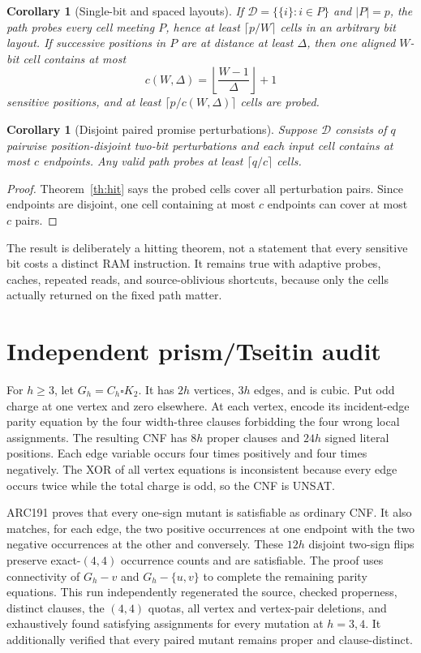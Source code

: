\documentclass[11pt]{article}
\newtheorem{corollary}[theorem]{Corollary}
\begin{document}
\begin{corollary}[Single-bit and spaced layouts]\label{cor:space}
If $\mathcal D=\{\{i\}:i\in P\}$ and $|P|=p$, the path probes every cell
meeting $P$, hence at least $\lceil p/W\rceil$ cells in an arbitrary bit
layout.  If successive positions in $P$ are at distance at least $\Delta$,
then one aligned $W$-bit cell contains at most
\[
 c(W,\Delta)=\left\lfloor\frac{W-1}{\Delta}\right\rfloor+1
\]
sensitive positions, and at least $\lceil p/c(W,\Delta)\rceil$ cells are
probed.
\end{corollary}

\begin{corollary}[Disjoint paired promise perturbations]\label{cor:pairs}
Suppose $\mathcal D$ consists of $q$ pairwise position-disjoint two-bit
perturbations and each input cell contains at most $c$ endpoints.  Any valid
path probes at least $\lceil q/c\rceil$ cells.
\end{corollary}
\begin{proof}
Theorem~\ref{th:hit} says the probed cells cover all perturbation pairs.
Since endpoints are disjoint, one cell containing at most $c$ endpoints can
cover at most $c$ pairs.
\end{proof}

The result is deliberately a hitting theorem, not a statement that every
sensitive bit costs a distinct RAM instruction.  It remains true with
adaptive probes, caches, repeated reads, and source-oblivious shortcuts,
because only the cells actually returned on the fixed path matter.

\section{Independent prism/Tseitin audit}
For $h\ge3$, let $G_h=C_h\square K_2$.  It has $2h$ vertices, $3h$ edges,
and is cubic.  Put odd charge at one vertex and zero elsewhere.  At each
vertex, encode its incident-edge parity equation by the four width-three
clauses forbidding the four wrong local assignments.  The resulting CNF has
$8h$ proper clauses and $24h$ signed literal positions.  Each edge variable
occurs four times positively and four times negatively.  The XOR of all
vertex equations is inconsistent because every edge occurs twice while the
total charge is odd, so the CNF is UNSAT.

ARC191 proves that every one-sign mutant is satisfiable as ordinary CNF.  It
also matches, for each edge, the two positive occurrences at one endpoint
with the two negative occurrences at the other and conversely.  These
$12h$ disjoint two-sign flips preserve exact-$(4,4)$ occurrence counts and
are satisfiable.  The proof uses connectivity of $G_h-v$ and
$G_h-\{u,v\}$ to complete the remaining parity equations.  This run
independently regenerated the source, checked properness, distinct clauses,
the $(4,4)$ quotas, all vertex and vertex-pair deletions, and exhaustively
found satisfying assignments for every mutation at $h=3,4$.  It additionally
verified that every paired mutant remains proper and clause-distinct.
\end{document}
